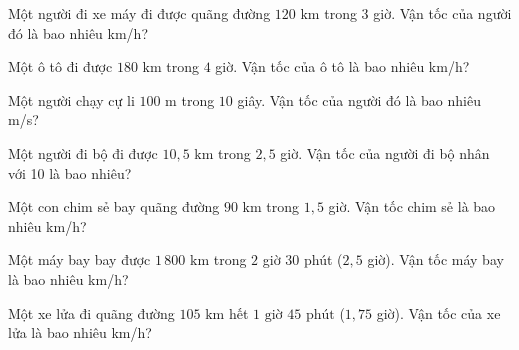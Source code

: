 
\begin{ex}
  Một người đi xe máy đi được quãng đường $120\text{ km}$ trong $3$ giờ. Vận tốc của người đó là bao nhiêu km/h?
\end{ex}

\begin{ex}
  Một ô tô đi được $180\text{ km}$ trong $4$ giờ. Vận tốc của ô tô là bao nhiêu km/h?
\end{ex}

\begin{ex}
  Một người chạy cự li $100\text{ m}$ trong $10$ giây. Vận tốc của người đó là bao nhiêu m/s?
\end{ex}

\begin{ex}
  Một người đi bộ đi được $10{,}5\text{ km}$ trong $2{,}5$ giờ. Vận tốc của người đi bộ nhân với 10 là bao nhiêu?
\end{ex}

\begin{ex}
  Một con chim sẻ bay quãng đường $90\text{ km}$ trong $1{,}5$ giờ. Vận tốc chim sẻ là bao nhiêu km/h?
\end{ex}

\begin{ex}
  Một máy bay bay được $1\,800\text{ km}$ trong $2$ giờ $30$ phút ($2{,}5$ giờ). Vận tốc máy bay là bao nhiêu km/h?
\end{ex}

\begin{ex}
  Một xe lửa đi quãng đường $105\text{ km}$ hết $1\text{ giờ } 45\text{ phút}$ ($1{,}75$ giờ). Vận tốc của xe lửa là bao nhiêu km/h?
\end{ex}

